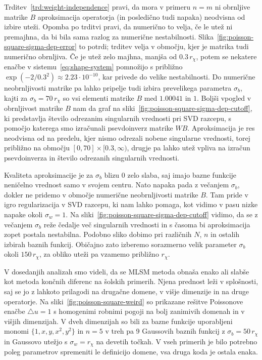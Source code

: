 \documentclass[12pt,a4paper,twoside]{article}
\theoremstyle{definition} %
\theoremstyle{plain} %
\numberwithin{equation}{section}
\newcommand{\lap}{\triangle}
\begin{document}
Trditev~\ref{trd:weight-independence} pravi, da mora v primeru $n=m$ ni
obrnljive matrike $B$ aproksimacija operatorja (in posledično tudi napaka) neodvisna od
izbire uteži. Opomba po trditvi pravi, da numerično to velja, če le utež ni
premajhna, da bi bila sama razlog za numerične nestabilnosti.
Slika~\ref{fig:poisson-square-sigma-dep-error} to potrdi; trditev velja v
območju, kjer je matrika tudi numerično obrnljiva. Če je utež zelo
majhna, manjša od $0.3\,r_\chi$, potem se nekatere enačbe v
sistemu~\eqref{eq:shape-system} pomnožijo s približno $\exp(-2/0.3^2) \approx
2.23\cdot10^{-10}$, kar privede do velike nestabilnosti. Do numerične
neobrnljivosti matrike pa lahko pripelje tudi izbira prevelikega parametra
$\sigma_b$, kajti za $\sigma_b = 70\,r_\chi$ so vsi elementi matrike $B$
med $1.00041$ in $1$. Boljši vpogled v obrnljivost matrike $B$ nam da graf na
sliki~\ref{fig:poisson-square-sigma-dep-cutoff}, ki predstavlja število
odrezanim singularnih vrednosti pri SVD razcepu, s pomočjo katerega smo
izračunali psevdoinverz matrike $WB$. Aproksimacija je res neodvisna od
na predelu, kjer nismo odrezali nobene singularne vrednosti, torej približno
na območju $[0, 70] \times [0.3, \infty)$, drugje pa lahko utež vpliva na
izračun psevdoinverza in število odrezanih singularnih vrednosti.

Kvaliteta aproksimacije je za $\sigma_b$ blizu 0 zelo slaba, saj imajo bazne
funkcije neničelno vrednost samo v svojem centru. Nato napaka pada z večanjem
$\sigma_b$, dokler ne pridemo v območje numerične neobrnljivosti matrike $B$.
Tam pride v igro regularizacija v SVD razcepu, ki nam lahko pomaga, kot vidimo
v pasu nizke napake okoli $\sigma_w = 1$. Na
sliki~\ref{fig:poisson-square-sigma-dep-cutoff} vidimo, da se z večanjem
$\sigma_b$ reže čedalje več singularnih vrednosti in s časoma bi aproksimacija
zopet postala nestabilna. Podobno sliko dobimo pri različnih $N$, $n$ in
ostalih izbirah baznih funkcij. Običajno zato izberemo sorazmerno velik
parameter $\sigma_b$ okoli $150\,r_\chi$, za obliko uteži pa vzamemo približno
$r_\chi$.

V dosedanjih analizah smo videli, da se MLSM metoda obnaša enako ali slabše kot
metoda končnih diferenc na šolskih primerih. Njena prednost leži v splošnosti,
saj se jo z lahkoto prilagodi na drugačne domene, v višje dimenzije in na druge
operatorje. Na sliki~\ref{fig:poisson-square-weird} so prikazane rešitve
Poissonove enačbe $\lap u = 1$ s homogenimi robnimi pogoji na bolj
zanimivih domenah in v višjih dimenzijah. V dveh dimenzijah so bili za bazne
funkcije uporabljeni monomi $\{1, x, y, x^2, y^2\}$ in $n=5$ v treh pa 9
Gaussovih baznih funkcij z $\sigma_b = 50\,r_\chi$ in Gaussovo utežjo s
$\sigma_w = r_\chi$ na devetih točkah. V vseh primerih je bilo potrebno
poleg parametrov spremeniti le definicijo domene, vsa druga koda je ostala
enaka.
\end{document}
